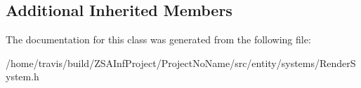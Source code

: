 \subsection*{Additional Inherited Members}


The documentation for this class was generated from the following file\-:\begin{DoxyCompactItemize}
\item 
/home/travis/build/\-Z\-S\-A\-Inf\-Project/\-Project\-No\-Name/src/entity/systems/Render\-System.\-h\end{DoxyCompactItemize}
